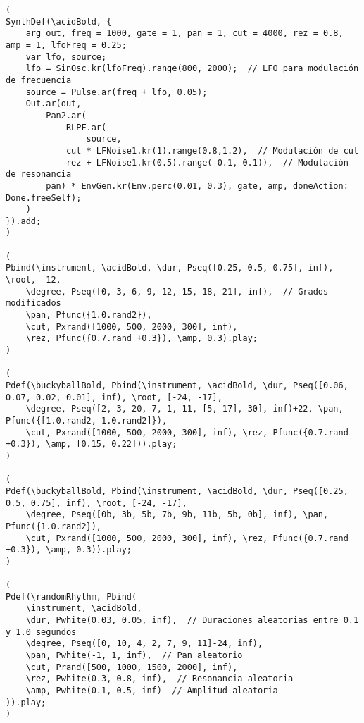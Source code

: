 \begin{minipage}[t]{1\textwidth}
    \centering
    \begin{lstlisting}[style=SuperCollider-IDE, basicstyle=\footnotesize\ttfamily, numbers=none]
(
SynthDef(\acidBold, {
    arg out, freq = 1000, gate = 1, pan = 1, cut = 4000, rez = 0.8, amp = 1, lfoFreq = 0.25;
    var lfo, source;
    lfo = SinOsc.kr(lfoFreq).range(800, 2000);  // LFO para modulación de frecuencia
    source = Pulse.ar(freq + lfo, 0.05);
    Out.ar(out,
        Pan2.ar(
            RLPF.ar(
                source,
            cut * LFNoise1.kr(1).range(0.8,1.2),  // Modulación de cut
            rez + LFNoise1.kr(0.5).range(-0.1, 0.1)),  // Modulación de resonancia
        pan) * EnvGen.kr(Env.perc(0.01, 0.3), gate, amp, doneAction: Done.freeSelf);
    )
}).add;
)

(
Pbind(\instrument, \acidBold, \dur, Pseq([0.25, 0.5, 0.75], inf), \root, -12,
    \degree, Pseq([0, 3, 6, 9, 12, 15, 18, 21], inf),  // Grados modificados
    \pan, Pfunc({1.0.rand2}),
    \cut, Pxrand([1000, 500, 2000, 300], inf),
    \rez, Pfunc({0.7.rand +0.3}), \amp, 0.3).play;
)

(
Pdef(\buckyballBold, Pbind(\instrument, \acidBold, \dur, Pseq([0.06, 0.07, 0.02, 0.01], inf), \root, [-24, -17],
    \degree, Pseq([2, 3, 20, 7, 1, 11, [5, 17], 30], inf)+22, \pan, Pfunc({[1.0.rand2, 1.0.rand2]}),
    \cut, Pxrand([1000, 500, 2000, 300], inf), \rez, Pfunc({0.7.rand +0.3}), \amp, [0.15, 0.22])).play;
)

(
Pdef(\buckyballBold, Pbind(\instrument, \acidBold, \dur, Pseq([0.25, 0.5, 0.75], inf), \root, [-24, -17],
    \degree, Pseq([0b, 3b, 5b, 7b, 9b, 11b, 5b, 0b], inf), \pan, Pfunc({1.0.rand2}),
    \cut, Pxrand([1000, 500, 2000, 300], inf), \rez, Pfunc({0.7.rand +0.3}), \amp, 0.3)).play;
)

(
Pdef(\randomRhythm, Pbind(
    \instrument, \acidBold,
    \dur, Pwhite(0.03, 0.05, inf),  // Duraciones aleatorias entre 0.1 y 1.0 segundos
    \degree, Pseq([0, 10, 4, 2, 7, 9, 11]-24, inf),
    \pan, Pwhite(-1, 1, inf),  // Pan aleatorio
    \cut, Prand([500, 1000, 1500, 2000], inf),
    \rez, Pwhite(0.3, 0.8, inf),  // Resonancia aleatoria
    \amp, Pwhite(0.1, 0.5, inf)  // Amplitud aleatoria
)).play;
)
    \end{lstlisting}
    \vspace{1cm}
\end{minipage}








